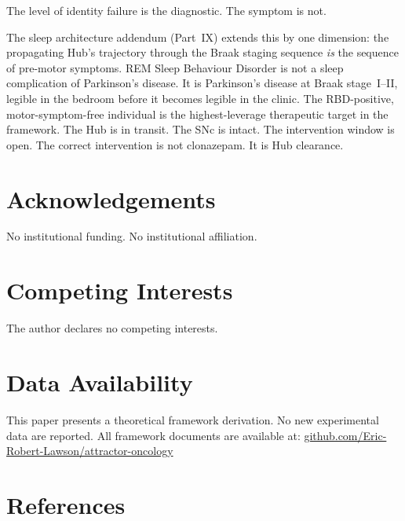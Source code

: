 \documentclass[12pt,a4paper]{article}
\begin{document}
The level of identity failure is the diagnostic. The symptom is not.

The sleep architecture addendum (Part~IX) extends this by one dimension:
the propagating Hub's trajectory through the Braak staging sequence
\emph{is} the sequence of pre-motor symptoms. REM Sleep Behaviour Disorder
is not a sleep complication of Parkinson's disease. It is Parkinson's
disease at Braak stage~I--II, legible in the bedroom before it becomes
legible in the clinic. The RBD-positive, motor-symptom-free individual is
the highest-leverage therapeutic target in the framework. The Hub is in
transit. The SNc is intact. The intervention window is open.
The correct intervention is not clonazepam.
It is Hub clearance.

\section*{Acknowledgements}

No institutional funding. No institutional affiliation.

\section*{Competing Interests}

The author declares no competing interests.

\section*{Data Availability}

This paper presents a theoretical framework derivation. No new experimental
data are reported. All framework documents are available at:
\href{https://github.com/Eric-Robert-Lawson/attractor-oncology}{github.com/Eric-Robert-Lawson/attractor-oncology}

\section*{References}
\end{document}
